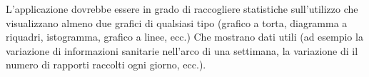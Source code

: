 \documentclass{article}
\begin{document}
L'applicazione dovrebbe essere in grado di raccogliere statistiche sull'utilizzo che visualizzano almeno due grafici di qualsiasi tipo (grafico a torta, diagramma a riquadri, istogramma, grafico a linee, ecc.) Che mostrano dati utili (ad esempio la variazione di informazioni sanitarie nell'arco di una settimana, la variazione di il numero di rapporti raccolti ogni giorno, ecc.).







\end{document}
